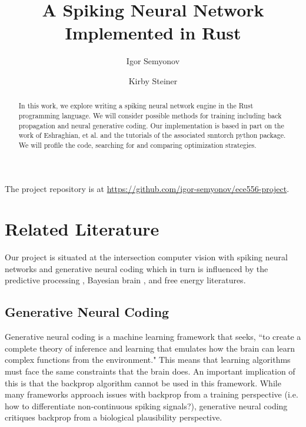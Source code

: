 \documentclass[12pt,english]{article}
\title{
    A Spiking Neural Network Implemented in Rust
}
\author{Igor Semyonov}
\author{Kirby Steiner}
\affil{George Mason University}
\begin{document}
\maketitle

\begin{abstract}
    In this work, we explore writing a spiking neural network engine in the Rust programming language.
    We will consider possible methods for training including back propagation and neural generative coding.
    Our implementation is based in part on the work of Eshraghian, et al. \cite{snntorch} and the tutorials of the associated snntorch python package.
    We will profile the code, searching for and comparing optimization strategies.
\end{abstract}

The project repository is at \href{https://github.com/igor-semyonov/ece556-project}{https://github.com/igor-semyonov/ece556-project}.

\section{Related Literature}
Our project is situated at the intersection computer vision with spiking neural networks \cite{Hasan23} and generative neural coding \cite{OrorbiaKifer22} which in turn is influenced by the predictive processing \cite{Clark15, Bubic10, Kveraga07}, Bayesian brain \cite{Knill04, Deneve04, Kersten04}, and free energy \cite{Friston10} literatures.

\subsection{Generative Neural Coding}
Generative neural coding is a machine learning framework that seeks, ``to create a complete theory of inference and learning that emulates how the brain can learn complex functions from the environment." \cite{Ororbia23_a} This means that learning algorithms must face the same constraints that the brain does. An important implication of this is that the backprop algorithm cannot be used in this framework. While many frameworks approach issues with backprop from a training perspective (i.e. how to differentiate non-continuous spiking signals?), generative neural coding critiques backprop from a biological plausibility perspective.
\end{document}
